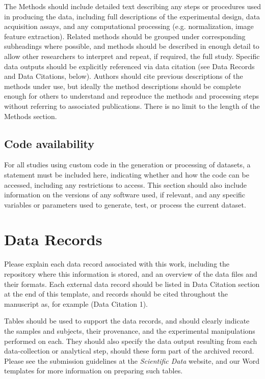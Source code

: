 \documentclass[english]{article}
\begin{document}
The Methods should include detailed text describing any steps or procedures 
used in producing the data, including full descriptions of the experimental 
design, data acquisition assays, and any computational processing (e.g. 
normalization, image feature extraction). Related methods should be grouped 
under corresponding subheadings where possible, and methods should be described 
in enough detail to allow other researchers to interpret and repeat, if required, 
the full study. Specific data outputs should be explicitly referenced via data 
citation (see Data Records and Data Citations, below). Authors should cite 
previous descriptions of the methods under use, but ideally the method 
descriptions should be complete enough for others to understand and reproduce 
the methods and processing steps without referring to associated publications. 
There is no limit to the length of the Methods section.

\subsection*{Code availability}

For all studies using custom code in the generation or processing of datasets, 
a statement must be included here, indicating whether and how the code can be 
accessed, including any restrictions to access. This section should also include 
information on the versions of any software used, if relevant, and any specific 
variables or parameters used to generate, test, or process the current dataset. 


\section*{Data Records}

Please explain each data record associated with this work, including
the repository where this information is stored, and an overview of
the data files and their formats. Each external data record should
be listed in Data Citation section at the end of this template, and 
records should be cited throughout the manuscript as, for example 
(Data Citation 1). 

Tables should be used to support the data records, and should clearly indicate 
the samples and subjects, their provenance, and the experimental manipulations 
performed on each. They should also specify the data output resulting from each 
data-collection or analytical step, should these form part of the archived record. 
Please see the submission guidelines at the \emph{Scientific Data} website, and 
our Word templates for more information on preparing such tables. 
\end{document}
